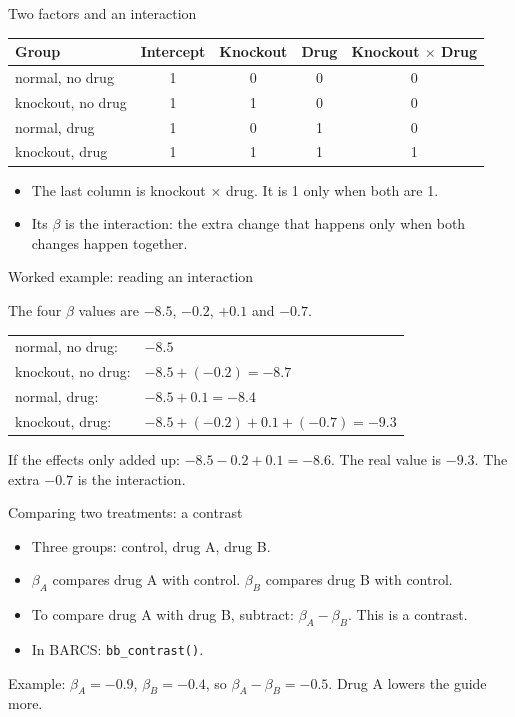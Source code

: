\documentclass[aspectratio=169,11pt]{beamer}
\begin{document}
\begin{frame}{Two factors and an interaction}
\begin{center}
\begin{tabular}{l|cccc}
\toprule
Group & Intercept & Knockout & Drug & Knockout $\times$ Drug\\
\midrule
normal, no drug   & 1 & 0 & 0 & 0\\
knockout, no drug & 1 & 1 & 0 & 0\\
normal, drug      & 1 & 0 & 1 & 0\\
knockout, drug    & 1 & 1 & 1 & 1\\
\bottomrule
\end{tabular}
\end{center}
\begin{itemize}
\item The last column is knockout $\times$ drug. It is 1 only when both are
  1.
\item Its $\beta$ is the \alert{interaction}: the extra change that happens
  only when both changes happen together.
\end{itemize}
\end{frame}

\begin{frame}{Worked example: reading an interaction}
\begin{worked}[ 9]
The four $\beta$ values are $-8.5$, $-0.2$, $+0.1$ and $-0.7$.

\begin{tabular}{@{}ll@{}}
normal, no drug:   & $-8.5$\\
knockout, no drug: & $-8.5 + (-0.2) = -8.7$\\
normal, drug:      & $-8.5 + 0.1 = -8.4$\\
knockout, drug:    & $-8.5 + (-0.2) + 0.1 + (-0.7) = -9.3$\\
\end{tabular}

If the effects only added up: $-8.5 - 0.2 + 0.1 = -8.6$. The real value
is $-9.3$. The extra $-0.7$ is the interaction.
\end{worked}
\end{frame}

\begin{frame}{Comparing two treatments: a contrast}
\begin{itemize}
\item Three groups: control, drug A, drug B.
\item $\beta_A$ compares drug A with control. $\beta_B$ compares drug B with
  control.
\item To compare drug A with drug B, subtract: $\beta_A - \beta_B$. This is
  a \alert{contrast}.
\item In BARCS: \texttt{bb\_contrast()}.
\end{itemize}
\medskip
Example: $\beta_A = -0.9$, $\beta_B = -0.4$, so
$\beta_A - \beta_B = -0.5$. Drug A lowers the guide more.
\end{frame}
\end{document}
